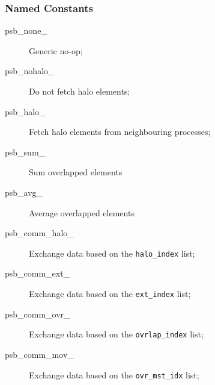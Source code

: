 \subsubsection{Named Constants}
\label{sec:cd_constants}
\begin{description}
\item[psb\_none\_] Generic no-op;
\item[psb\_nohalo\_]  Do not fetch halo elements;
\item[psb\_halo\_]  Fetch halo elements from neighbouring processes;
\item[psb\_sum\_] Sum overlapped elements
\item[psb\_avg\_] Average overlapped elements
\item[psb\_comm\_halo\_] Exchange data based on the \verb|halo_index|
  list;
\item[psb\_comm\_ext\_] Exchange data based on the \verb|ext_index|
  list;
\item[psb\_comm\_ovr\_] Exchange data based on the \verb|ovrlap_index|
  list;
\item[psb\_comm\_mov\_] Exchange data based on the \verb|ovr_mst_idx|
  list;

\end{description}


